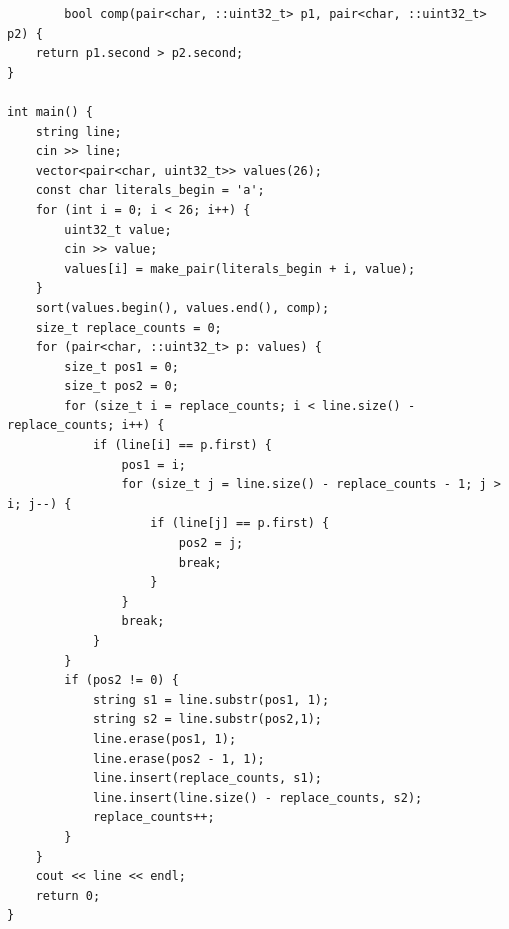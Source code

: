 \begin{center}
    \begin{verbatim}
        bool comp(pair<char, ::uint32_t> p1, pair<char, ::uint32_t> p2) {
    return p1.second > p2.second;
}

int main() {
    string line;
    cin >> line;
    vector<pair<char, uint32_t>> values(26);
    const char literals_begin = 'a';
    for (int i = 0; i < 26; i++) {
        uint32_t value;
        cin >> value;
        values[i] = make_pair(literals_begin + i, value);
    }
    sort(values.begin(), values.end(), comp);
    size_t replace_counts = 0;
    for (pair<char, ::uint32_t> p: values) {
        size_t pos1 = 0;
        size_t pos2 = 0;
        for (size_t i = replace_counts; i < line.size() - replace_counts; i++) {
            if (line[i] == p.first) {
                pos1 = i;
                for (size_t j = line.size() - replace_counts - 1; j > i; j--) {
                    if (line[j] == p.first) {
                        pos2 = j;
                        break;
                    }
                }
                break;
            }
        }
        if (pos2 != 0) {
            string s1 = line.substr(pos1, 1);
            string s2 = line.substr(pos2,1);
            line.erase(pos1, 1);
            line.erase(pos2 - 1, 1);
            line.insert(replace_counts, s1);
            line.insert(line.size() - replace_counts, s2);
            replace_counts++;
        }
    }
    cout << line << endl;
    return 0;
}
    \end{verbatim}
\end{center}
\normalsize
\BgThispage
\newpage

